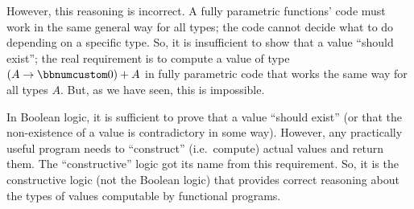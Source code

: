 However, this reasoning is incorrect. A fully parametric functions'
code must work in the same general way for all types; the code cannot
decide what to do depending on a specific type. So, it is insufficient
to show that a value ``should exist''; the real requirement is to
compute a value of type $\left(A\rightarrow\bbnum 0\right)+A$ in
fully parametric code that works the same way for all types $A$.
But, as we have seen, this is impossible.

In Boolean logic, it is sufficient to prove that a value ``should
exist'' (or that the non-existence of a value is contradictory in
some way). However, any practically useful program needs to ``construct''
(i.e.~compute) actual values and return them. The ``constructive''
logic got its name from this requirement. So, it is the constructive
logic (not the Boolean logic) that provides correct reasoning about
the types of values computable by functional programs.
